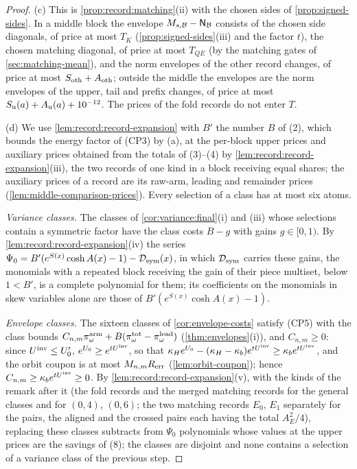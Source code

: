 \begin{proof}
(c) This is \cref{prop:record:matching}(ii) with the chosen sides of
\cref{prop:signed-sides}. In a middle block the envelope $M_{s,\mathcal B}-\mathsf N_\mathcal B$
consists of the chosen side diagonals, of price at most $T_K$
(\cref{prop:signed-sides}(iii) and the factor $t$), the chosen matching
diagonal, of price at most $T_{QE}$ (by the matching gates of \cref{sec:matching-mean}),
and the norm envelopes of the other record changes,
of price at most $S_{\rm oth}+A_{\rm oth}$; outside the middle the envelopes are the
norm envelopes of the upper, tail and prefix changes, of price at most
$S_{\rm u}(a)+A_{\rm u}(a)+10^{-12}$. The prices of the fold records do not
enter $T$.

(d) We use \cref{lem:record:record-expansion} with $B'$ the number $B$ of (2),
which bounds the energy factor of (CP3) by (a), at the per-block upper prices
and auxiliary prices obtained from the totals of (3)--(4) by
\cref{lem:record:record-expansion}(iii), the two records of one kind in a
block receiving equal shares; the auxiliary prices of a record are its
raw-arm, leading and remainder prices (\cref{lem:middle-comparison-prices}).
Every selection of a class has at most six atoms.

\emph{Variance classes.} The classes of \cref{cor:variance:final}(i) and (iii)
whose selections contain a symmetric factor have the class costs $B-g$ with
gains $g\in[0,1)$. By \cref{lem:record:record-expansion}(iv) the series
$\Psi_0=B'(e^{S(x)}\cosh A(x)-1)-\mathcal D_{\rm sym}(x)$, in which
$\mathcal D_{\rm sym}$ carries these gains, the monomials with a repeated
block receiving the gain of their piece multiset, below $1<B'$, is a complete
polynomial for them; its coefficients on the monomials in skew variables alone
are those of $B'(e^{S(x)}\cosh A(x)-1)$.

\emph{Envelope classes.} The sixteen classes of \cref{cor:envelope-costs}
satisfy (CP5) with the class bounds
$C_{n,m}\pi^{\rm arm}_\omega+B(\pi^{\rm tot}_\omega-\pi^{\rm lead}_\omega)$
(\cref{thm:envelopes}(i)), and $C_{n,m}\ge0$: since $U^{\mathrm{inv}}\le U_0'$,
$e^{U_0}\ge e^{tU^{\mathrm{inv}}}$, so that
$\kappa_He^{U_0}-(\kappa_H-\kappa_b)e^{tU^{\mathrm{inv}}}\ge\kappa_be^{tU^{\mathrm{inv}}}$, and the orbit
coupon is at most $M_{n,m}R_{\rm err}$ (\cref{lem:orbit-coupon}); hence
$C_{n,m}\ge\kappa_be^{tU^{\mathrm{inv}}}\ge0$. By \cref{lem:record:record-expansion}(v), with
the kinds of the remark after it (the fold records and the merged matching
records for the general classes and for $(0,4)$, $(0,6)$; the two matching
records $E_0$, $E_1$ separately for the pairs, the aligned and the crossed
pairs each having the total $A_E^2/4$), replacing these classes subtracts
from $\Psi_0$ polynomials whose values at the upper prices are the savings
of (8); the classes are disjoint and none contains a selection of a
variance class of the previous step.


\end{proof}
